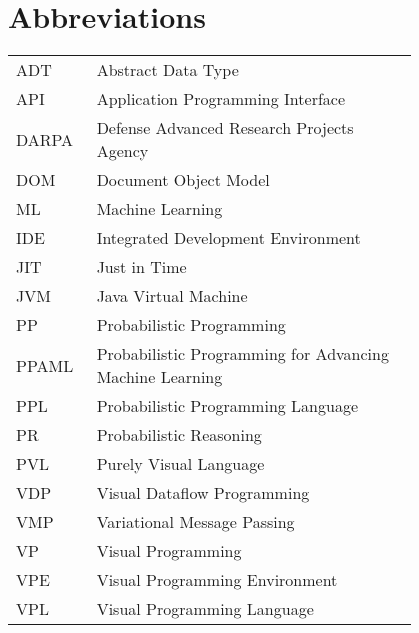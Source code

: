 \chapter*{Abbreviations}

\begin{flushleft}
\begin{tabular}{l p{0.8\linewidth}}
ADT      & Abstract Data Type\\
API      & Application Programming Interface\\
DARPA    & Defense Advanced Research Projects Agency\\
DOM      & Document Object Model\\
ML       & Machine Learning\\
IDE      & Integrated Development Environment\\
JIT      & Just in Time\\
JVM      & Java Virtual Machine\\
PP       & Probabilistic Programming\\
PPAML    & Probabilistic Programming for Advancing Machine Learning\\
PPL      & Probabilistic Programming Language\\
PR       & Probabilistic Reasoning\\
PVL      & Purely Visual Language\\
VDP      & Visual Dataflow Programming\\
VMP      & Variational Message Passing\\
VP       & Visual Programming\\
VPE      & Visual Programming Environment\\
VPL      & Visual Programming Language
\end{tabular}
\end{flushleft}
